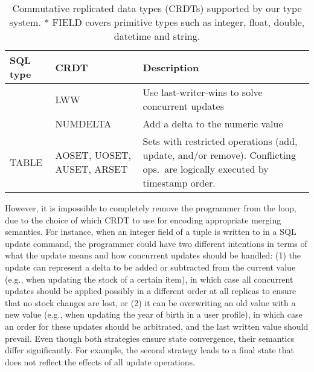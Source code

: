 \begin{table}[t!]
\centering
\begin{tabular}{|>{\centering\arraybackslash}m{1.2in}|>{\centering\arraybackslash}m{0.8in}|>{\centering\arraybackslash}m{1.9in}|}
\hline
SQL type & CRDT & Description \\
\hline
\hline
\multirow{3}{*}{FIELD*} & LWW &  Use last-writer-wins to solve concurrent updates\\\cline{2-3}
 & NUMDELTA  &  Add a delta to the numeric value \\\hline
TABLE & AOSET,                       UOSET,                AUSET,              ARSET & Sets with restricted operations (add, update, and/or remove).
Conflicting ops.\ are logically executed by timestamp order.\\
\hline
\end{tabular}
\caption{Commutative replicated data types (CRDTs) supported by our type system. *
FIELD covers primitive types such as integer, float, double, datetime and string.}
\label{tab:crdts}
\end{table}

However, it is impossible to completely remove the programmer from the
loop, due to the choice of which CRDT to use for encoding appropriate merging
semantics. For instance, when an integer field of a tuple is written
to in a SQL update command, the programmer could have two different
intentions in terms of what the update means and how concurrent
updates should be handled: (1) the update can represent a delta to be
added or subtracted from the current value (e.g., when updating the
stock of a certain item), in which case all concurrent updates should
be applied possibly in a different order at all replicas to ensure that no stock
changes are lost, or (2) it can be overwriting an old value with a new
value (e.g., when updating the year of birth in a user profile), in
which case an order for these updates should be arbitrated, and the last
written value should prevail. Even though both strategies ensure
state convergence, their semantics differ significantly. For example,
the second strategy leads to a final state that does not reflect the effects
of all update operations.

